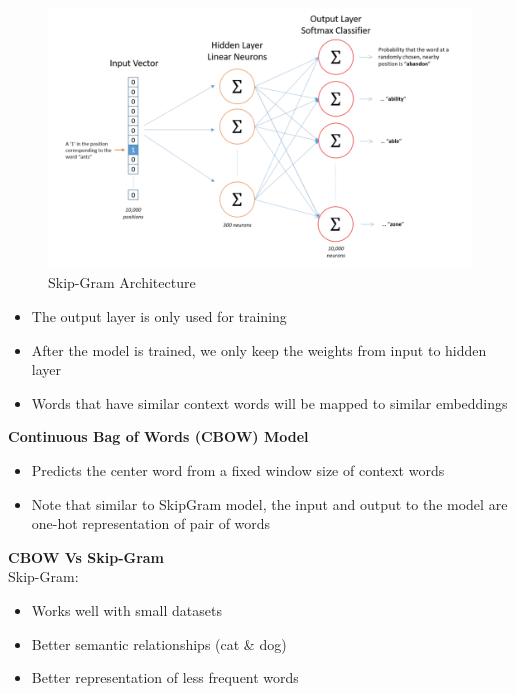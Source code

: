 \begin{figure}
    \centering
    \includegraphics[width=1\linewidth]{skipgramarc.png}
    \caption{Skip-Gram Architecture}
    \label{fig:enter-label}
\end{figure}

\begin{itemize}
    \item The output layer is only used for training
    \item After the model is trained, we only keep the weights from input to hidden layer
    \item Words that have similar context words will be mapped to similar embeddings
\end{itemize}

\newpage

\textbf{Continuous Bag of Words (CBOW) Model}

\begin{itemize}
    \item Predicts the center word from a fixed window size of context words
    \item Note that similar to SkipGram model, the input and output to the model are one-hot representation of pair of words
\end{itemize}

\textbf{CBOW Vs Skip-Gram}\\

Skip-Gram:
\begin{itemize}
  \item Works well with small datasets
  \item Better semantic relationships (cat \& dog)
  \item Better representation of less frequent words
\end{itemize}

